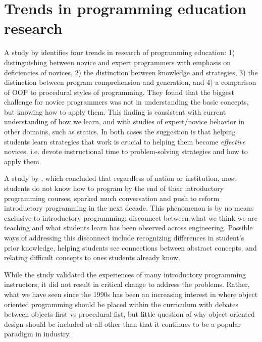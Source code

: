 \documentclass[12pt]{article}
\begin{document}
\section{Trends in programming education research}
A \citeyear{robins_learning_2003} study by
\citeauthor{robins_learning_2003} identifies four trends in research
of programming education: 1) distinguishing between novice and expert
programmers with emphasis on deficiencies of novices, 2) the
distinction between knowledge and strategies, 3) the distinction
between program comprehension and generation, and 4) a comparison of
OOP to procedural styles of
programming\autocite{robins_learning_2003}. They found that the
biggest challenge for novice programmers was not in understanding the
basic concepts, but knowing how to apply them. This finding is
consistent with current understanding of how we
learn\autocite{bransford_how_2000,ambrose_chapter_2010}, and with
studies of expert/novice behavior in other domains, such as
statics\autocite{litzinger_cognitive_2010}. In both cases the
suggestion is that helping students learn strategies that work is
crucial to helping them become \emph{effective} novices, i.e. devote
instructional time to problem-solving strategies and how to apply
them.

A \citeyear{mccracken_multinational_2001} study by
\citeauthor{mccracken_multinational_2001}\autocite{mccracken_multinational_2001},
which concluded that regardless of nation or institution, most
students do not know how to program by the end of their introductory
programming courses, sparked much conversation and push to reform
introductory programming in the next decade. This phenomenon is by no
means exclusive to introductory programming: disconnect between what
we think we are teaching and what students learn has been observed
across
engineering\autocite{streveler_learning_2008,flynn_engineering_2014}. Possible
ways of addressing this disconnect include recognizing differences in
student's prior knowledge, helping students see connections between
abstract concepts, and relating difficult concepts to ones students
already know\autocite{streveler_learning_2008,slotta_helping_2006}.

While the \citeauthor{mccracken_multinational_2001} study validated the
experiences of many introductory programming instructors, it did not
result in critical change to address the problems. Rather, what we
have seen since the 1990s has been an increasing interest in where
object oriented programming should be placed within the curriculum
with debates between objects-first vs procedural-fist, but little
question of why object oriented design should be included at all other
than that it continues to be a popular paradigm in industry.
\end{document}
